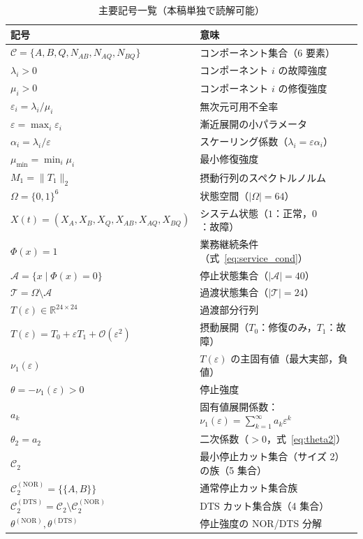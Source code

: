 \documentclass[12pt,a4paper]{article}
\theoremstyle{plain}
\theoremstyle{definition}
\theoremstyle{remark}
\newcommand{\calO}{\mathcal{O}}
\newcommand{\calA}{\mathcal{A}}
\newcommand{\calT}{\mathcal{T}}
\newcommand{\calC}{\mathcal{C}}
\newcommand{\eps}{\varepsilon}
\newcommand{\calCtwo}{\mathcal{C}_2}
\newcommand{\calCNOR}{\calCtwo^{(\mathrm{NOR})}}
\newcommand{\calCDTS}{\calCtwo^{(\mathrm{DTS})}}
\newcommand{\thetaNOR}{\theta^{(\mathrm{NOR})}}
\newcommand{\thetaDTS}{\theta^{(\mathrm{DTS})}}
\begin{document}
\begin{table}[H]
  \centering
  \caption{主要記号一覧（本稿単独で読解可能）}
  \label{tab:notation}
  \begin{tabular}{p{6cm}p{8.5cm}}
    \toprule
    記号 & 意味 \\
    \midrule
    $\calC = \{A,B,Q,N_{AB},N_{AQ},N_{BQ}\}$ & コンポーネント集合（6 要素） \\
    $\lambda_i > 0$ & コンポーネント $i$ の故障強度 \\
    $\mu_i > 0$ & コンポーネント $i$ の修復強度 \\
    $\eps_i = \lambda_i/\mu_i$ & 無次元可用不全率 \\
    $\eps = \max_i \eps_i$ & 漸近展開の小パラメータ \\
    $\alpha_i = \lambda_i/\eps$ & スケーリング係数（$\lambda_i=\eps\alpha_i$） \\
    $\mu_{\min} = \min_i \mu_i$ & 最小修復強度 \\
    $M_1 = \|T_1\|_2$ & 摂動行列のスペクトルノルム \\
    $\Omega = \{0,1\}^6$ & 状態空間（$|\Omega|=64$） \\
    $X(t) = (X_A,X_B,X_Q,X_{AB},X_{AQ},X_{BQ})$ & システム状態（$1$：正常，$0$：故障）\\
    $\Phi(x)=1$ & 業務継続条件（式~\eqref{eq:service_cond}） \\
    $\calA = \{x\mid\Phi(x)=0\}$ & 停止状態集合（$|\calA|=40$） \\
    $\calT = \Omega\setminus\calA$ & 過渡状態集合（$|\calT|=24$） \\
    $T(\eps)\in\mathbb{R}^{24\times24}$ & 過渡部分行列 \\
    $T(\eps)=T_0+\eps T_1+\calO(\eps^2)$ & 摂動展開（$T_0$：修復のみ，$T_1$：故障） \\
    $\nu_1(\eps)$ & $T(\eps)$ の主固有値（最大実部，負値） \\
    $\theta = -\nu_1(\eps) > 0$ & 停止強度 \\
    $a_k$ & 固有値展開係数：$\nu_1(\eps)=\sum_{k=1}^\infty a_k\eps^k$ \\
    $\theta_2 = a_2$ & 二次係数（$>0$，式~\eqref{eq:theta2}） \\
    $\calCtwo$ & 最小停止カット集合（サイズ 2）の族（5 集合） \\
    $\calCNOR = \{\{A,B\}\}$ & 通常停止カット集合族 \\
    $\calCDTS = \calCtwo\setminus\calCNOR$ & DTS カット集合族（4 集合） \\
    $\thetaNOR, \thetaDTS$ & 停止強度の NOR/DTS 分解 \\

\end{tabular}
\end{table}
\end{document}
